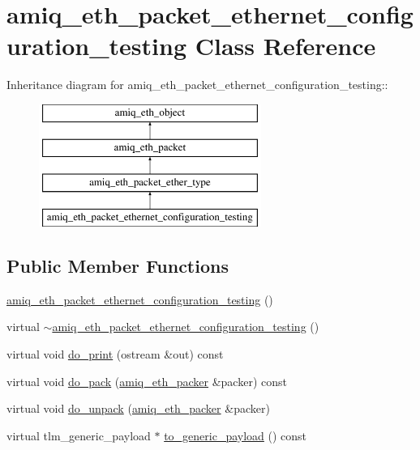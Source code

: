 \hypertarget{classamiq__eth__packet__ethernet__configuration__testing}{
\section{amiq\_\-eth\_\-packet\_\-ethernet\_\-configuration\_\-testing Class Reference}
\label{classamiq__eth__packet__ethernet__configuration__testing}
}
Inheritance diagram for amiq\_\-eth\_\-packet\_\-ethernet\_\-configuration\_\-testing::\begin{figure}[H]
\begin{center}
\leavevmode
\includegraphics[height=4cm]{classamiq__eth__packet__ethernet__configuration__testing}
\end{center}
\end{figure}
\subsection*{Public Member Functions}
\begin{DoxyCompactItemize}
\item 
\hyperlink{classamiq__eth__packet__ethernet__configuration__testing_aa8c3ffe26aecf8f091bef33b574cfefc}{amiq\_\-eth\_\-packet\_\-ethernet\_\-configuration\_\-testing} ()
\item 
virtual \hyperlink{classamiq__eth__packet__ethernet__configuration__testing_a7841ec746b28b5480d500606aeeac506}{$\sim$amiq\_\-eth\_\-packet\_\-ethernet\_\-configuration\_\-testing} ()
\item 
virtual void \hyperlink{classamiq__eth__packet__ethernet__configuration__testing_aaac4abb2c0104900e30360871e01bbbd}{do\_\-print} (ostream \&out) const 
\item 
virtual void \hyperlink{classamiq__eth__packet__ethernet__configuration__testing_a4ae6c0485066d7661170544fa64c7e49}{do\_\-pack} (\hyperlink{classamiq__eth__packer}{amiq\_\-eth\_\-packer} \&packer) const 
\item 
virtual void \hyperlink{classamiq__eth__packet__ethernet__configuration__testing_aff2640ccc3b20b80b16bb6ab20842f76}{do\_\-unpack} (\hyperlink{classamiq__eth__packer}{amiq\_\-eth\_\-packer} \&packer)
\item 
virtual tlm\_\-generic\_\-payload $\ast$ \hyperlink{classamiq__eth__packet__ethernet__configuration__testing_a0134f20913a67a5dafe334a450be8bb3}{to\_\-generic\_\-payload} () const 
\end{DoxyCompactItemize}
